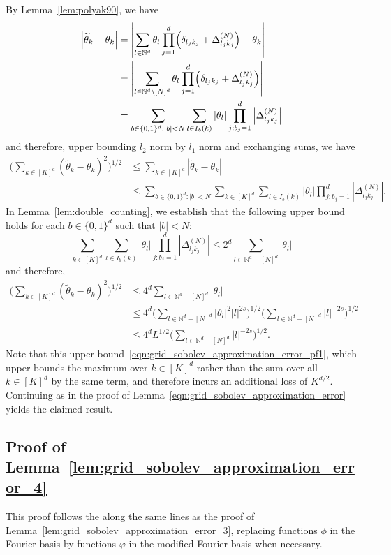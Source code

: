 \documentclass{article}
\newcommand{\abs}[1]{\left \lvert #1 \right \rvert}
\newcommand{\1}{\mathbf{1}}
\newcommand{\Nbb}{\mathbb{N}}
\newcommand{\wt}[1]{\widetilde{#1}}
\theoremstyle{alden}
\theoremstyle{aldenthm}
\theoremstyle{definition}
\theoremstyle{remark}
\begin{document}
By Lemma~\ref{lem:polyak90}, we have
\begin{align*}
\abs{\wt{\theta}_k - \theta_k} & = \abs{\sum_{l \in \Nbb^d}  \theta_l \prod_{j = 1}^{d}\Bigl( \delta_{l_j k_j} + \Delta_{l_jk_j}^{(N)}\Bigr)  - \theta_k} \\
& = \abs{\sum_{l \in \Nbb^d \setminus [N]^d}  \theta_l \prod_{j = 1}^{d}\Bigl( \delta_{l_j k_j} + \Delta_{l_jk_j}^{(N)}\Bigr)} \\
& = \sum_{b \in \{0,1\}^d: \abs{b} < N} \sum_{l \in I_b(k)} \abs{\theta_l} \prod_{j: b_j = 1}^{d} \abs{\Delta_{l_jk_j}^{(N)}}
\end{align*}
and therefore, upper bounding $l_2$ norm by $l_1$ norm and exchanging sums, we have
\begin{align*}
\biggl(\sum_{k \in [K]^d} (\wt{\theta}_k - \theta_k)^2\biggr)^{1/2} & \leq \sum_{k \in [K]^d} \abs{\wt{\theta}_k - \theta_k} \\
& \leq \sum_{b \in \{0,1\}^d: \abs{b} < N} \sum_{k \in [K]^d}  \sum_{l \in I_b(k)} \abs{\theta_l} \prod_{j: b_j = 1}^{d} \abs{\Delta_{l_jk_j}^{(N)}}.
\end{align*}
In Lemma~\ref{lem:double_counting}, we establish that the following upper bound holds for each $b \in \{0,1\}^d$ such that $\abs{b} < N$:
\begin{equation*}
\sum_{k \in [K]^d}  \sum_{l \in I_b(k)} \abs{\theta_l} \prod_{j: b_j = 1}^{d} \abs{\Delta_{l_jk_j}^{(N)}} \leq 2^d \sum_{l \in \Nbb^d - [N]^d} \abs{\theta_l}
\end{equation*}
and therefore,
\begin{align*}
\biggl(\sum_{k \in [K]^d} (\wt{\theta}_k - \theta_k)^2\biggr)^{1/2} & \leq 4^d \sum_{l \in \mathbb{N}^d - [N]^d} \abs{\theta_l} \\
& \leq 4^d \biggl(\sum_{l \in \mathbb{N}^d - [N]^d} \abs{\theta_l}^2 \abs{l}^{2s}\biggr)^{1/2} \biggl(\sum_{l \in \mathbb{N}^d - [N]^d} \abs{l}^{-2s}\biggr)^{1/2}  \\
& \leq 4^d L^{1/2} \biggl(\sum_{l \in \mathbb{N}^d - [N]^d} \abs{l}^{-2s}\biggr)^{1/2}.
\end{align*}
Note that this upper bound~\eqref{eqn:grid_sobolev_approximation_error_pf1}, which upper bounds the maximum over $k \in [K]^d$ rather than the sum over all $k \in [K]^d$ by the same term, and therefore incurs an additional loss of $K^{d/2}$. Continuing as in the proof of Lemma~\ref{eqn:grid_sobolev_approximation_error} yields the claimed result.

\subsection{Proof of Lemma~\ref{lem:grid_sobolev_approximation_error_4}}
This proof follows the along the same lines as the proof of Lemma~\ref{lem:grid_sobolev_approximation_error_3}, replacing functions $\phi$ in the Fourier basis by functions $\varphi$ in the modified Fourier basis when necessary.
\end{document}
